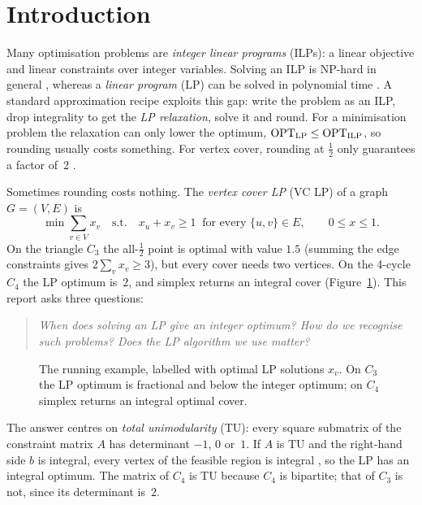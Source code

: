 \section{Introduction}\label{sec:intro}

Many optimisation problems are \emph{integer linear programs} (ILPs): a linear objective and linear constraints over integer variables. Solving an ILP is NP-hard in general \cite{karp1972}, whereas a \emph{linear program} (LP) can be solved in polynomial time \cite{khachiyan1979}. A standard approximation recipe exploits this gap: write the problem as an ILP, drop integrality to get the \emph{LP relaxation}, solve it and round. For a minimisation problem the relaxation can only lower the optimum, $\mathrm{OPT}_{\mathrm{LP}} \le \mathrm{OPT}_{\mathrm{ILP}}$, so rounding usually costs something. For vertex cover, rounding at $\tfrac12$ only guarantees a factor of~2 \cite{hochbaum1982}.

Sometimes rounding costs nothing. The \emph{vertex cover LP} (VC LP) of a graph $G=(V,E)$ is
\[
  \min \sum_{v\in V} x_v
  \quad\text{s.t.}\quad x_u + x_v \ge 1 \ \text{ for every } \{u,v\}\in E,
  \qquad 0 \le x \le 1 .
\]
On the triangle $C_3$ the all-$\tfrac12$ point is optimal with value $1.5$ (summing the edge constraints gives $2\sum_v x_v\ge3$), but every cover needs two vertices. On the 4-cycle $C_4$ the LP optimum is~$2$, and simplex returns an integral cover (Figure~\ref{fig:running}). This report asks three questions:

\begin{quote}\itshape
  When does solving an LP give an integer optimum? How do we recognise such problems? Does the LP algorithm we use matter?
\end{quote}

\begin{figure}[H]
  \centering
  
  \caption{The running example, labelled with optimal LP solutions $x_v$. On $C_3$ the LP optimum is fractional and below the integer optimum; on $C_4$ simplex returns an integral optimal cover.}
  \label{fig:running}
\end{figure}

The answer centres on \emph{total unimodularity} (TU): every square submatrix of the constraint matrix $A$ has determinant $-1$, $0$ or~$1$. If $A$ is TU and the right-hand side $b$ is integral, every vertex of the feasible region is integral \cite{hoffman1956}, so the LP has an integral optimum. The matrix of $C_4$ is TU because $C_4$ is bipartite; that of $C_3$ is not, since its determinant is~$2$.

